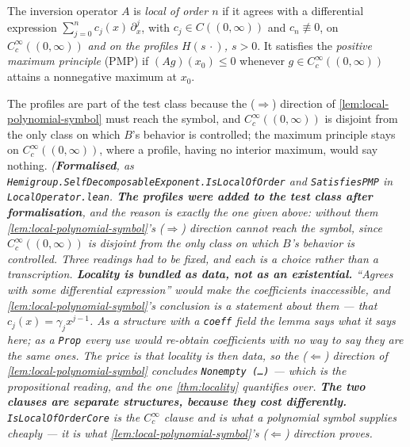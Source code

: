 \begin{definition}\label{def:locality-pmp}
\leanok
The inversion operator $A$ is \emph{local of order $n$} if it agrees with a differential
expression $\sum_{j=0}^{n} c_j(x)\,\partial_x^j$, with $c_j \in C((0,\infty))$ and
$c_n \not\equiv 0$, on $C_c^\infty((0,\infty))$ \emph{and on the profiles $H(s\,\cdot)$,
$s > 0$}. It satisfies the \emph{positive maximum principle} (PMP) if $(Ag)(x_0) \le 0$ whenever
$g \in C_c^\infty((0,\infty))$ attains a nonnegative maximum at $x_0$.

The profiles are part of the test class because the ($\Rightarrow$) direction of
\ref{lem:local-polynomial-symbol} must reach the symbol, and $C_c^\infty((0,\infty))$ is
disjoint from the only class on which $B$'s behavior is controlled; the maximum principle
stays on $C_c^\infty((0,\infty))$, where a profile, having no interior maximum, would say
nothing.
\statusT\quad\emph{(\textbf{Formalised}, as
\texttt{Hemigroup.SelfDecomposableExponent.IsLocalOfOrder} and \texttt{SatisfiesPMP} in
\texttt{LocalOperator.lean}. \textbf{The profiles were added to the test class after
formalisation}, and the reason is exactly the one given above: without them
\ref{lem:local-polynomial-symbol}'s ($\Rightarrow$) direction cannot reach the symbol, since
$C_c^\infty((0,\infty))$ is disjoint from the only class on which $B$'s behavior is controlled.
Three readings had to be fixed, and each is a choice rather
than a transcription.
\textbf{Locality is bundled as data, not as an existential.} ``Agrees with \emph{some}
differential expression'' would make the coefficients inaccessible, and
\ref{lem:local-polynomial-symbol}'s conclusion is a statement \emph{about} them --- that
$c_j(x) = \gamma_j x^{j-1}$. As a structure with a \texttt{coeff} field the lemma says what it
says here; as a \texttt{Prop} every use would re-obtain coefficients with no way to say they are
the same ones. The price is that locality is then data, so the ($\Leftarrow$) direction of
\ref{lem:local-polynomial-symbol} concludes \texttt{Nonempty (\ldots)} --- which is the
propositional reading, and the one \ref{thm:locality} quantifies over.
\textbf{The two clauses are separate structures, because they cost differently.}
\texttt{IsLocalOfOrderCore} is the $C_c^\infty$ clause and is what a polynomial symbol supplies
cheaply --- it is what \ref{lem:local-polynomial-symbol}'s ($\Leftarrow$) direction proves.
}
\end{definition}

